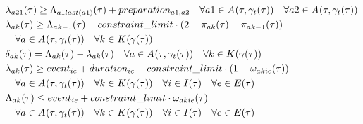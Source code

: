 \begin{alignat}{2}
	& \VarStartOfSegment{\ElementActivity2}{1} \geq \VarFinishOfSegment{\ElementActivity1}{last(\ElementActivity1)} + \ParPreparation                                                                    \quad \forall \ElementActivity1 \in \SetActivity{\VarSupervisorAssignment{}{\ElementTechnician}}{} \quad \forall \ElementActivity2 \in \SetActivity{\VarSupervisorAssignment{}{\ElementTechnician}}{}  \\
	& \VarStartOfSegment{\ElementActivity}{\ElementWorkSegment} \geq \VarFinishOfSegment{\ElementActivity}{\ElementWorkSegment-1} - \ParConstraintLimit \cdot (2 - \VarActiveSegment{\ElementActivity}{\ElementWorkSegment} + \VarActiveSegment{\ElementActivity}{\ElementWorkSegment-1})                                                                      \notag\\
	& \quad \forall \ElementActivity \in \SetActivity{\VarSupervisorAssignment{}{\ElementTechnician}}{} \quad\forall \ElementWorkSegment \in \SetWorkSegment                                                 \\ 
	& \VarProcessingTime = \VarFinishOfSegment{\ElementActivity}{\ElementWorkSegment} - \VarStartOfSegment{\ElementActivity}{\ElementWorkSegment}                                                                                                                                              \quad \forall \ElementActivity \in \SetActivity{\VarSupervisorAssignment{}{\ElementTechnician}}{}  \quad\forall \ElementWorkSegment \in \SetWorkSegment                                                \\
	& \VarStartOfSegment{\ElementActivity}{\ElementWorkSegment} \geq \ParEvent + \ParEventDuration - \ParConstraintLimit \cdot (1 - \VarSegmentInRelation) \notag\\ 
	& \quad \forall \ElementActivity \in \SetActivity{\VarSupervisorAssignment{}{\ElementTechnician}}{}  \quad\forall \ElementWorkSegment \in \SetWorkSegment                                           \quad \forall i \in \SetTimeInstance  \quad\forall \ElementEvent \in \SetEvent                                                                                                                         \\
	& \VarFinishOfSegment{\ElementActivity}{\ElementWorkSegment} \leq \ParEvent + \ParConstraintLimit \cdot \VarSegmentInRelation \notag\\
	& \quad \forall \ElementActivity \in \SetActivity{\VarSupervisorAssignment{}{\ElementTechnician}}{}  \quad\forall \ElementWorkSegment \in \SetWorkSegment                                         \quad \forall i \in \SetTimeInstance  \quad\forall \ElementEvent \in \SetEvent                                                                                                                         \\

\end{alignat}
